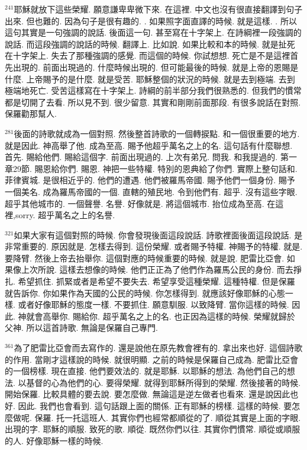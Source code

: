 \documentclass{book}
\begin{document}
$^{241}$耶穌就放下這些榮耀.
願意謙卑卑微下來.
在這裡.
中文也沒有很直接翻譯到句子出來.
但也難的.
因為句子是很有趣的.
.
如果照字面直譯的時候.
就是這樣.
.
所以這句其實是一句強調的說話.
後面這一句.
甚至寫在十字架上.
在詩綱裡一段強調的說話.
而這段強調的說話的時候.
翻譯上.
比如說.
如果比較和本的時候.
就是扯死在十字架上.
失去了那種強調的感覺.
而這個的時候.
你試想想.
死亡是不是這裡首先出現的.
前面出現過的.
什麼時候出現的.
但可能最後的時候.
就是上帝的恩賜是什麼.
上帝賜予的是什麼.
就是受苦.
耶穌整個的狀況的時候.
就是去到極端.
去到極端地死亡.
受苦這樣寫在十字架上.
詩綱的前半部分我們很熟悉的.
但我們的慣常都是切開了去看.
所以見不到.
很少留意.
其實和剛剛前面那段.
有很多說話在對照.
保羅勸那幫人.

$^{281}$後面的詩歌就成為一個對照.
然後整首詩歌的一個轉捩點.
和一個很重要的地方.
就是因此.
神高舉了他.
成為至高.
賜予他超乎萬名之上的名.
這句話有什麼聯想.
首先.
賜給他們.
賜給這個字.
前面出現過的.
上次有弟兄.
問我.
和我提過的.
第一章29節.
賜恩給你們.
賜恩.
神把一些特權.
特別的恩典給了你們.
實際上整句話和.
菲律賓城.
是很相近乎的.
他們的遭遇.
他們被羅馬帝國.
賜予他們一個身份.
賜予一個美名.
成為羅馬帝國的一個.
直轄的殖民地.
令到他們有.
超乎.
沒有這些字眼.
超乎其他城市的.
一個聲譽.
名譽.
好像就是.
將這個城市.
抬位成為至高.
在這裡,sorry.
超乎萬名之上的名譽.

$^{321}$如果大家有這個對照的時候.
你會發現後面這段說話.
詩歌裡面後面這段說話.
是非常重要的.
原因就是.
怎樣去得到.
這份榮耀.
或者賜予特權.
神賜予的特權.
就是.
要降臂.
然後上帝去抬舉你.
這個對應的時候重要的時候.
就是說.
肥雷比亞會.
如果像上次所說.
這樣去想像的時候.
他們正正為了他們作為羅馬公民的身份.
而去掙扎.
希望抓住.
抓緊或者是希望不要失去.
希望享受這種榮耀.
這種特權.
但是保羅就告訴你.
你如果作為天國的公民的時候.
你怎樣得到.
就應該好像耶穌的心態一樣.
或者好像耶穌的態度一樣.
不要抓住.
願意馴服.
以致降臂.
當你這樣的時候.
因此.
神就會高舉你.
賜給你.
超乎萬名之上的名.
也正因為這樣的時候.
榮耀就歸於父神.
所以這首詩歌.
無論是保羅自己專門.

$^{361}$為了肥雷比亞會而去寫作的.
還是說他在原先教會裡有的.
拿出來也好.
這個詩歌的作用.
當剛才這樣說的時候.
就很明顯.
之前的時候是保羅自己成為.
肥雷比亞會的一個榜樣.
現在直接.
他們要效法的.
就是耶穌.
以耶穌的想法.
為他們自己的想法.
以基督的心為他們的心.
要得榮耀.
就得到耶穌所得到的榮耀.
然後接著的時候.
開始保羅.
比較具體的要去說.
要怎麼做.
無論這是逆左做者也看來.
還是說因此也好.
因此.
我們也會看到.
這句話跟上面的關係.
正有耶穌的榜樣.
這樣的時候.
要怎麼做呢.
保羅.
托一托這班人.
其實你們也經常都順從的了.
順從其實是上面的字眼.
出現的字.
耶穌的順服.
致死的歌.
順從.
既然你們以往.
其實你們慣常.
順從或順服的人.
好像耶穌一樣的時候.
\end{document}
